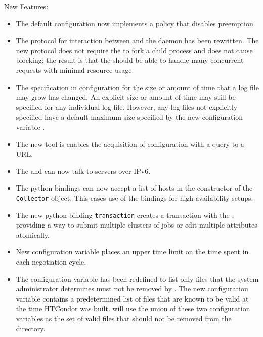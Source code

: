 \noindent New Features:

\begin{itemize}

\item The default configuration now implements a policy 
that disables preemption.

\item The protocol for interaction between  and the 
 daemon has been rewritten.
The new protocol does not require the  to fork a child process 
and does not cause blocking; 
the result is that the  should be able to handle
many concurrent  requests with minimal resource usage.

\item The specification in configuration for the size or amount of time
that a log file may grow has changed.
An explicit size or amount of time may still be specified for any
individual log file.
However, any log files not explicitly specified have a default maximum
size specified by the new configuration variable 
.

\item The new  tool is enables the  acquisition of
configuration with a query to a URL.

\item The  and  can now talk to
servers over IPv6.

\item The python bindings can now accept a list of  hosts
in the constructor of the \texttt{Collector} object.  
This eases use of the bindings for high availability setups.

\item The new python binding \texttt{transaction} creates a transaction
with the ,
providing a way to submit multiple clusters of jobs
or edit multiple attributes atomically.

\item New configuration variable 
places an upper time limit on the time spent in each negotiation cycle.

\item The configuration variable  has been redefined
to list only files that the system administrator determines must not
be removed by .
The new configuration variable  contains 
a predetermined list of files that are known to be valid at 
the time HTCondor was built. 
 will use the union of these two configuration variables 
as the set of valid files that should not be removed from the 
directory.


\end{itemize}
